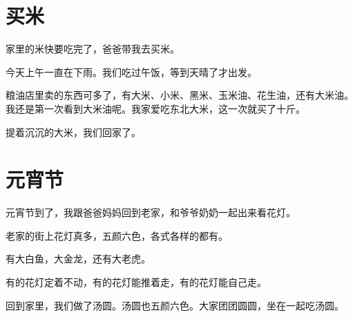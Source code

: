 \documentclass[12pt,UTF-8,openany]{ctexbook}
\begin{document}
\hanzibox{}\hanzibox{}\hanzibox{}\hanzibox{}\hspace{1em}\hanzibox{}\hanzibox{}\hanzibox{}\hanzibox{}






\chapter{买米}

\begin{large}
    
    家里的米快要吃完了，爸爸带我去买米。
    
    今天上午一直在下雨。我们吃过午饭，等到天晴了才出发。
    
    粮油店里卖的东西可多了，有大米、小米、黑米、玉米油、花生油，还有大米油。我还是第一次看到大米油呢。我家爱吃东北大米，这一次就买了十斤。
    
    提着沉沉的大米，我们回家了。
    
\end{large}


\clearpage

\begin{center}
    
    
    
\end{center}


\hanzibox{}\hanzibox{}\hanzibox{}\hanzibox{}\hspace{1em}\hanzibox{}\hanzibox{}\hanzibox{}\hanzibox{}

\hanzibox{}\hanzibox{}\hanzibox{}\hanzibox{}\hspace{1em}\hanzibox{}\hanzibox{}\hanzibox{}\hanzibox{}

\hanzibox{}\hanzibox{}\hanzibox{}\hanzibox{}\hspace{1em}\hanzibox{}\hanzibox{}\hanzibox{}\hanzibox{}






\chapter{元宵节}

\begin{large}
    
    元宵节到了，我跟爸爸妈妈回到老家，和爷爷奶奶一起出来看花灯。
    
    老家的街上花灯真多，五颜六色，各式各样的都有。
    
    有大白鱼，大金龙，还有大老虎。
    
    有的花灯定着不动，有的花灯能推着走，有的花灯能自己走。
    
    回到家里，我们做了汤圆。汤圆也五颜六色。大家团团圆圆，坐在一起吃汤圆。
    
\end{large}
\end{document}
